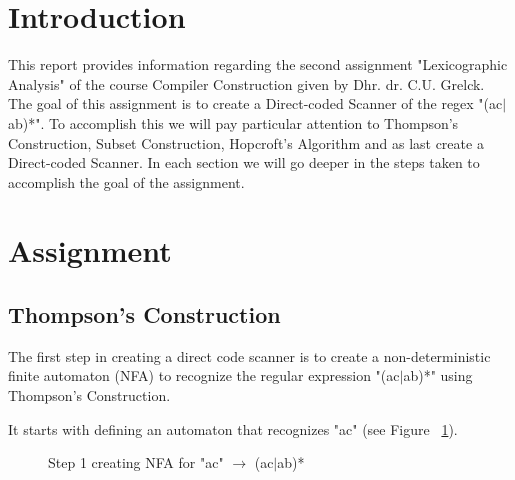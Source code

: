 \documentclass{uva-inf-article}
\begin{document}
\section{Introduction}
\begin{flushleft}
\par This report provides information regarding the second assignment 
     "Lexicographic Analysis" of the course Compiler Construction given by Dhr. dr. C.U. Grelck. 
     The goal of this assignment is to create a Direct-coded Scanner of the regex "(ac$\mid$ab)*". To accomplish this we will pay particular attention to 
     Thompson’s Construction, Subset Construction, Hopcroft’s Algorithm and as last create a Direct-coded Scanner. In each section we will go deeper 
     in the steps taken to accomplish the goal of the assignment.


\newpage
\section{Assignment}

\subsection{Thompson’s Construction}

    \par The first step in creating a direct code scanner is to create a 
         non-deterministic finite automaton (NFA) to recognize the regular expression
         "(ac$\mid$ab)*" using Thompson's Construction.

    \par It starts with defining an automaton that recognizes "ac" (see Figure ~\ref{fig:ThCoStep1}).

    \begin{figure}[h]
        \label{fig:ThCoStep1}
        \centering
        \caption{Step 1 creating NFA for "ac" $\rightarrow$ (ac$\mid$ab)*}
    \end{figure}


\end{flushleft}
\end{document}
